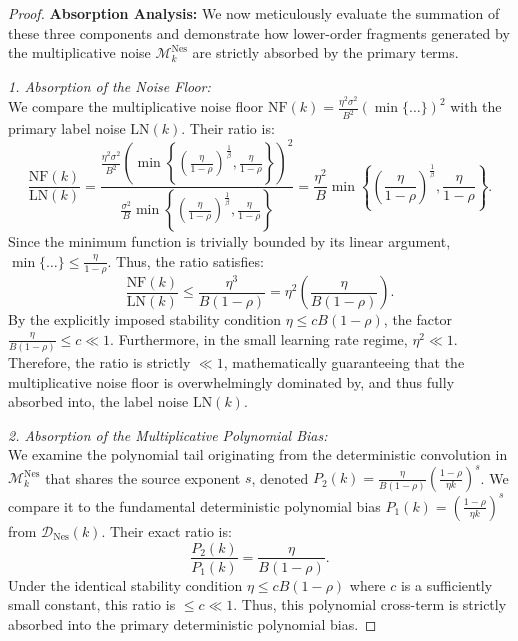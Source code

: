 \begin{proof}
\textbf{Absorption Analysis:}
We now meticulously evaluate the summation of these three components and demonstrate how lower-order fragments generated by the multiplicative noise $\mathcal M_k^{\mathrm{Nes}}$ are strictly absorbed by the primary terms.

\textit{1. Absorption of the Noise Floor:} \\
We compare the multiplicative noise floor $\text{NF}(k) = \frac{\eta^2\sigma^2}{B^2} \left(\min\{\dots\}\right)^2$ with the primary label noise $\text{LN}(k)$. Their ratio is:
\begin{equation*}
    \frac{\text{NF}(k)}{\text{LN}(k)} = \frac{\frac{\eta^2\sigma^2}{B^2} \left( \min\left\{\left(\frac{\eta}{1-\rho}\right)^{\frac1\beta}, \frac{\eta}{1-\rho}\right\} \right)^2}{\frac{\sigma^2}{B} \min\left\{\left(\frac{\eta}{1-\rho}\right)^{\frac1\beta}, \frac{\eta}{1-\rho}\right\}} = \frac{\eta^2}{B} \min\left\{\left(\frac{\eta}{1-\rho}\right)^{\frac1\beta}, \frac{\eta}{1-\rho}\right\}.
\end{equation*}
Since the minimum function is trivially bounded by its linear argument, $\min\{\dots\} \le \frac{\eta}{1-\rho}$. Thus, the ratio satisfies:
\begin{equation*}
    \frac{\text{NF}(k)}{\text{LN}(k)} \le \frac{\eta^3}{B(1-\rho)} = \eta^2 \left(\frac{\eta}{B(1-\rho)}\right).
\end{equation*}
By the explicitly imposed stability condition $\eta \le cB(1-\rho)$, the factor $\frac{\eta}{B(1-\rho)} \le c \ll 1$. Furthermore, in the small learning rate regime, $\eta^2 \ll 1$. Therefore, the ratio is strictly $\ll 1$, mathematically guaranteeing that the multiplicative noise floor is overwhelmingly dominated by, and thus fully absorbed into, the label noise $\text{LN}(k)$.

\textit{2. Absorption of the Multiplicative Polynomial Bias:} \\
We examine the polynomial tail originating from the deterministic convolution in $\mathcal M_k^{\mathrm{Nes}}$ that shares the source exponent $s$, denoted $P_2(k) = \frac{\eta}{B(1-\rho)}\left(\frac{1-\rho}{\eta k}\right)^s$. We compare it to the fundamental deterministic polynomial bias $P_1(k) = \left(\frac{1-\rho}{\eta k}\right)^s$ from $\mathcal{D}_{\mathrm{Nes}}(k)$. Their exact ratio is:
\begin{equation*}
    \frac{P_2(k)}{P_1(k)} = \frac{\eta}{B(1-\rho)}.
\end{equation*}
Under the identical stability condition $\eta \le cB(1-\rho)$ where $c$ is a sufficiently small constant, this ratio is $\le c \ll 1$. Thus, this polynomial cross-term is strictly absorbed into the primary deterministic polynomial bias.


\end{proof}
